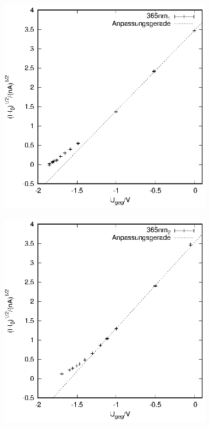 \begin{figure}[h]
  \centering
  \begin{subfigure}[h]{0.49\textwidth}
    \centering
    \includegraphics{data/Messung_photoeffekt/365nm_1.eps}
  \end{subfigure}
  \begin{subfigure}[h]{0.49\textwidth}
    \centering
    \includegraphics{data/Messung_photoeffekt/365nm_2.eps}
  \end{subfigure}
\end{figure}

